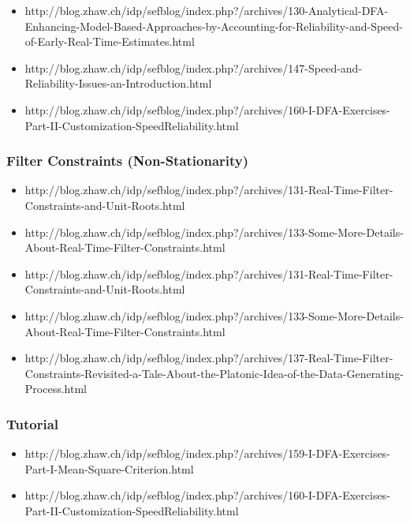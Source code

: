 \documentclass[11pt]{article}
\begin{document}
\begin{itemize}
\item http://blog.zhaw.ch/idp/sefblog/index.php?/archives/130-Analytical-DFA-Enhancing-Model-Based-Approaches-by-Accounting-for-Reliability-and-Speed-of-Early-Real-Time-Estimates.html
\item http://blog.zhaw.ch/idp/sefblog/index.php?/archives/147-Speed-and-Reliability-Issues-an-Introduction.html
\item http://blog.zhaw.ch/idp/sefblog/index.php?/archives/160-I-DFA-Exercises-Part-II-Customization-SpeedReliability.html
\end{itemize}

\subsubsection{Filter Constraints (Non-Stationarity)}

\begin{itemize}

\item http://blog.zhaw.ch/idp/sefblog/index.php?/archives/131-Real-Time-Filter-Constraints-and-Unit-Roots.html
\item http://blog.zhaw.ch/idp/sefblog/index.php?/archives/133-Some-More-Details-About-Real-Time-Filter-Constraints.html
\item http://blog.zhaw.ch/idp/sefblog/index.php?/archives/131-Real-Time-Filter-Constraints-and-Unit-Roots.html
\item http://blog.zhaw.ch/idp/sefblog/index.php?/archives/133-Some-More-Details-About-Real-Time-Filter-Constraints.html
\item http://blog.zhaw.ch/idp/sefblog/index.php?/archives/137-Real-Time-Filter-Constraints-Revisited-a-Tale-About-the-Platonic-Idea-of-the-Data-Generating-Process.html
\end{itemize}



\subsubsection{Tutorial}

\begin{itemize}
\item http://blog.zhaw.ch/idp/sefblog/index.php?/archives/159-I-DFA-Exercises-Part-I-Mean-Square-Criterion.html
\item http://blog.zhaw.ch/idp/sefblog/index.php?/archives/160-I-DFA-Exercises-Part-II-Customization-SpeedReliability.html
\end{itemize}
\end{document}
